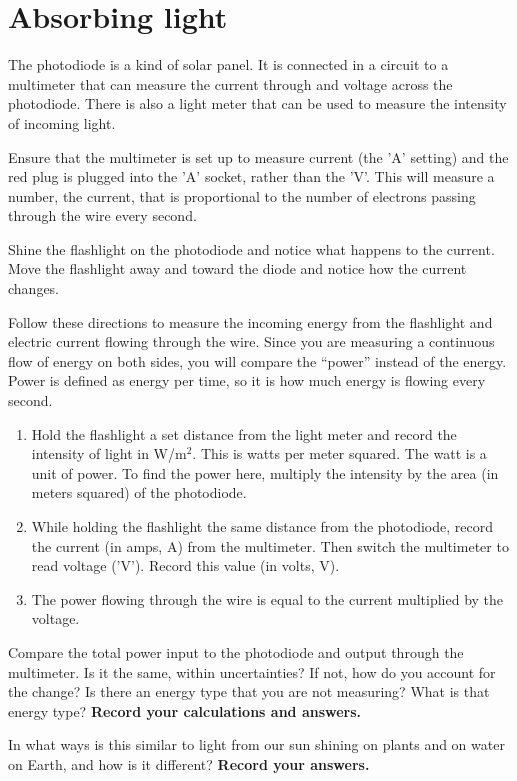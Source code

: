 \section{Absorbing light}

The photodiode is a kind of solar panel. It is connected in a circuit to a multimeter that can measure the current through and voltage across the photodiode. There is also a light meter that can be used to measure the intensity of incoming light.

\begin{steps}
	\item Ensure that the multimeter is set up to measure current (the 'A' setting) and the red plug is plugged into the 'A' socket, rather than the 'V'. This will measure a number, the current, that is proportional to the number of electrons passing through the wire every second.
	
	\item Shine the flashlight on the photodiode and notice what happens to the current. Move the flashlight away and toward the diode and notice how the current changes.
	
	\item Follow these directions to measure the incoming energy from the flashlight and electric current flowing through the wire. Since you are measuring a continuous flow of energy on both sides, you will compare the ``power'' instead of the energy. Power is defined as energy per time, so it is how much energy is flowing every second.
	\begin{enumerate}
		\item Hold the flashlight a set distance from the light meter and record the intensity of light in W/m$^2$. This is watts per meter squared. The watt is a unit of power. To find the power here, multiply the intensity by the area (in meters squared) of the photodiode.
		
		\item While holding the flashlight the same distance from the photodiode, record the current (in amps, A) from the multimeter. Then switch the multimeter to read voltage ('V'). Record this value (in volts, V).
		
		\item The power flowing through the wire is equal to the current multiplied by the voltage.
	\end{enumerate}

	\item Compare the total power input to the photodiode and output through the multimeter. Is it the same, within uncertainties? If not, how do you account for the change? Is there an energy type that you are not measuring? What is that energy type? \textbf{Record your calculations and answers.}
	
	\item In what ways is this similar to light from our sun shining on plants and on water on Earth, and how is it different? \textbf{Record your answers.}
\end{steps}

